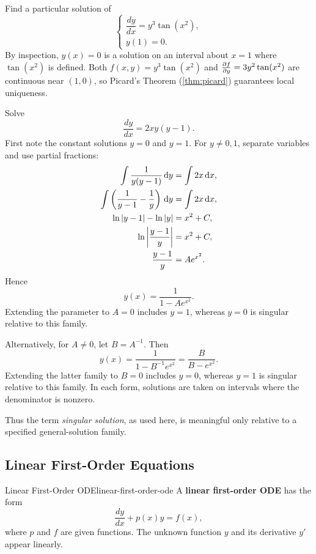 \begin{example}
  Find a particular solution of
  \[
    \begin{cases}
      \dfrac{dy}{dx}=y^3\tan(x^2), \\
      y(1)=0.
    \end{cases}
  \]
  By inspection, $y(x)=0$ is a solution on an interval about $x=1$ where $\tan(x^2)$ is defined.
  Both $f(x,y)=y^3\tan(x^2)$ and $\frac{\partial f}{\partial y}=3y^2\tan(x^2)$ are continuous near $(1,0)$, so Picard's Theorem (\ref{thm:picard}) guarantees local uniqueness.
\end{example}

\begin{example}
  Solve
  \[
    \frac{dy}{dx}=2xy(y-1).
  \]
  First note the constant solutions $y=0$ and $y=1$. For $y\ne0,1$, separate variables and use partial fractions:
  \begin{align*}
    \int\frac{1}{y(y-1)}\,\mathrm{d}y                       & = \int 2x\,\mathrm{d}x, \\
    \int\left(\frac{1}{y-1}-\frac{1}{y}\right)\,\mathrm{d}y & = \int 2x\,\mathrm{d}x, \\
    \ln\left\lvert y-1 \right\rvert-\ln\left\lvert y \right\rvert                          & = x^2+C,         \\
    \ln\left\lvert \frac{y-1}{y} \right\rvert                           & = x^2+C,         \\
    \frac{y-1}{y}                                    & = Ae^{x^2}.
  \end{align*}
  Hence
  \[
    y(x)=\frac{1}{1-Ae^{x^2}}.
  \]
  Extending the parameter to $A=0$ includes $y=1$, whereas $y=0$ is singular relative to this family.

  Alternatively, for $A\ne0$, let $B=A^{-1}$. Then
  \[
    y(x)=\frac{1}{1-B^{-1}e^{x^2}}
    =\frac{B}{B-e^{x^2}}.
  \]
  Extending the latter family to $B=0$ includes $y=0$, whereas $y=1$ is singular relative to this family. In each form, solutions are taken on intervals where the denominator is nonzero.

  Thus the term \emph{singular solution}, as used here, is meaningful only relative to a specified general-solution family.
\end{example}

\subsection{Linear First-Order Equations}

\begin{definition}{Linear First-Order ODE}{linear-first-order-ode}
  A \textbf{linear first-order ODE} has the form
  \[
    \frac{dy}{dx}+p(x)y=f(x),
  \]
  where $p$ and $f$ are given functions. The unknown function $y$ and its derivative $y'$ appear linearly.
\end{definition}


